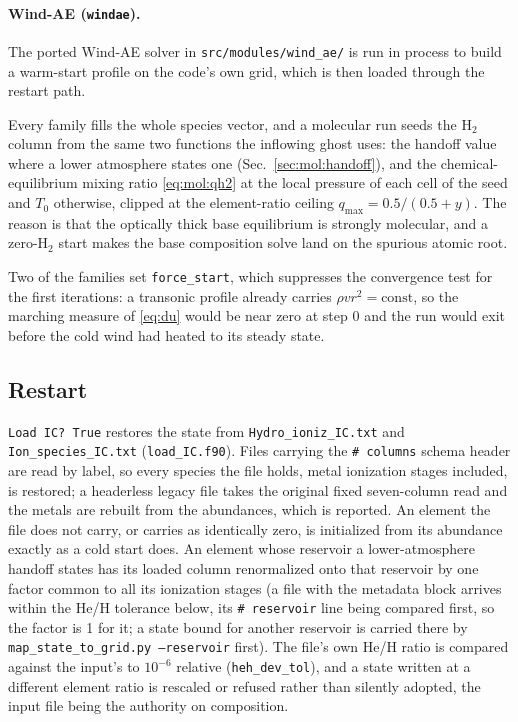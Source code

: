 \paragraph{Wind-AE (\texttt{windae}).}
The ported Wind-AE solver in \texttt{src/modules/wind\_ae/} is run in process
to build a warm-start profile on the code's own grid, which is then loaded
through the restart path.

Every family fills the whole species vector, and a molecular run seeds the
$\mathrm{H}_2$ column from the same two functions the inflowing ghost uses:
the handoff value where a lower atmosphere states one
(Sec.~\ref{sec:mol:handoff}), and the chemical-equilibrium mixing ratio
\eqref{eq:mol:qh2} at the local pressure of each cell of the seed and $T_0$
otherwise, clipped at the
element-ratio ceiling $q_{\max} = 0.5/(0.5 + y)$.  The reason is that
the optically thick base equilibrium is strongly molecular, and a zero-$\mathrm{H}_2$
start makes the base composition solve land on the spurious atomic root.

Two of the families set \texttt{force\_start}, which suppresses the
convergence test for the first iterations: a transonic profile already carries
$\rho v r^2 = \text{const}$, so the marching measure of \eqref{eq:du} would be
near zero at step 0 and the run would exit before the cold wind had heated to
its steady state.

\subsection{Restart}
\label{sec:bcic:restart}

\texttt{Load IC? True} restores the state from \texttt{Hydro\_ioniz\_IC.txt}
and \texttt{Ion\_species\_IC.txt} (\texttt{load\_IC.f90}).  Files carrying the
\texttt{\# columns} schema header are read by label, so every species the file
holds, metal ionization stages included, is restored; a headerless legacy file
takes the original fixed seven-column read and the metals are rebuilt from the
abundances, which is reported.  An element the file does not carry, or carries
as identically zero, is initialized from its abundance exactly as a cold start
does.  An element whose reservoir a lower-atmosphere handoff states has its
loaded column renormalized onto that reservoir by one factor common to all its
ionization stages (a file with the metadata block arrives within the He/H
tolerance below, its \texttt{\# reservoir} line being compared first, so the
factor is 1 for it; a state bound for another reservoir is carried there by
\texttt{map\_state\_to\_grid.py --reservoir} first).  The file's own He/H
ratio is compared against the input's to $10^{-6}$ relative
(\texttt{heh\_dev\_tol}), and a state written at a different element ratio is
rescaled or refused rather than silently adopted, the input file being the
authority on composition.

